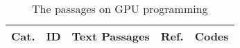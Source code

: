 \clearpage
\onecolumn

{\tiny
\begin{longtable}{|l|p{0.6cm}|p{11.8cm}|p{0.6cm}|p{2cm}|}
	\caption{The passages on GPU programming}\label{tab:gpu_passages}                                                                                                                                                                                                                                                                                                                                                                                                                                                              \\

	\toprule
	\textbf{Cat.} & \textbf{ID} & \textbf{Text Passages}                                                                                                                                                                                                                                                                                                                                                                                                                                                                                              & \textbf{Ref.} & \textbf{Codes} \\
	\midrule
	\endfirsthead


\end{longtable}}
